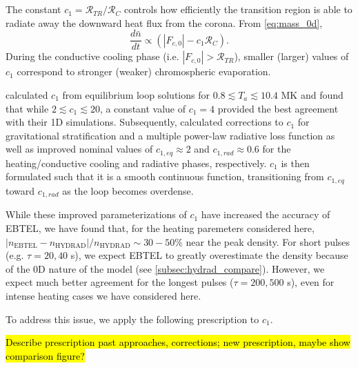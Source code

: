 \documentclass[]{aastex}
\begin{document}
	\section{}
	\label{appendix_c1_corrections}
	\par The constant $c_1=\mathcal{R}_{TR}/\mathcal{R}_C$ controls how efficiently the transition region is able to radiate away the downward heat flux from the corona. From \autoref{eq:mass_0d},
	\begin{equation}
		\frac{d\bar{n}}{dt}\propto(|F_{c,0}|-c_1\mathcal{R}_C).
	\end{equation}
	During the conductive cooling phase (i.e. $|F_{c,0}|>\mathcal{R}_{TR}$), smaller (larger) values of $c_1$ correspond to stronger (weaker) chromospheric evaporation. 
	\par\citet{klimchuk_highly_2008} calculated $c_1$ from equilibrium loop solutions for $0.8\lesssim T_a\lesssim10.4$ MK and found that while $2\lesssim c_1\lesssim20$, a constant value of $c_1=4$ provided the best agreement with their 1D simulations. Subsequently, \citet{cargill_enthalpy-based_2012} calculated corrections to $c_1$ for gravitational stratification and a multiple power-law radiative loss function as well as improved nominal values of $c_{1,eq}\approx2$ \citep[from the equilbrium scaling laws of][]{martens_scaling_2010} and $c_{1,rad}\approx0.6$ \citep[using an analysis similar to that of][]{bradshaw_cooling_2005,bradshaw_cooling_2010,bradshaw_new_2010} for the heating/conductive cooling and radiative phases, respectively. $c_1$ is then formulated such that it is a smooth continuous function, transitioning from $c_{1,eq}$ toward $c_{1,rad}$ as the loop becomes overdense.
	\par While these improved parameterizations of $c_1$ have increased the accuracy of EBTEL, we have found that, for the heating paremeters considered here, $|n_{\mathrm{EBTEL}}-n_{\mathrm{HYDRAD}}|/n_{\mathrm{HYDRAD}}\sim30-50\%$ near the peak density. For short pulses (e.g. $\tau=20,40$ s), we expect EBTEL to greatly overestimate the density because of the 0D nature of the model (see \autoref{subsec:hydrad_compare}). However, we expect much better agreement for the longest pulses ($\tau=200,500$ s), even for intense heating cases we have considered here.
	\par To address this issue, we apply the following prescription to $c_1$.
	\par\hl{Describe prescription past approaches, corrections; new prescription, maybe show comparison figure?} 
\end{document}
